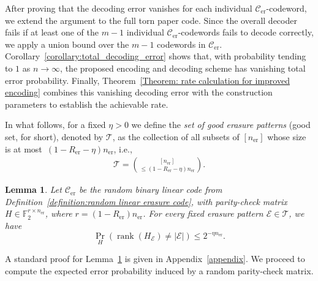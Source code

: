 \documentclass[journal,letterpaper,onecolumn,11pt]{IEEEtran}
\newcommand{\cC}{\mathcal{C}}
\newcommand{\cE}{\mathcal{E}}
\newcommand{\cT}{\mathcal{T}}
\newcommand{\rank}{\operatorname{rank}}
\newtheorem{lemma}{Lemma}
\begin{document}
After proving that the decoding error vanishes for each individual $\cC_{\mathrm{er}}$-codeword, we extend the argument to the full torn paper code. 
Since the overall decoder fails if at least one of the $m-1$ individual $\cC_{\mathrm{er}}$-codewords fails to decode correctly, we apply a union bound over the $m-1$ codewords in $\cC_{\mathrm{er}}$.
Corollary~\ref{corollary:total_decoding_error} shows that, with probability tending to
$1$ as $n \to \infty$, the proposed encoding and decoding scheme has vanishing total error probability. 
Finally,
Theorem~\ref{Theorem: rate calculation for improved encoding} combines this vanishing decoding error with the
construction parameters to establish the achievable rate.

In what follows, for a fixed $\eta>0$ we define the \textit{set of good erasure patterns} (good set, for short), denoted by $\cT$, as the collection of all subsets of $[n_{\mathrm{er}}]$ whose size is at most~$(1-R_{\mathrm{er}}-\eta)n_{\mathrm{er}}$, i.e.,
\begin{align}\label{equation: definition of mathcal T}
     \cT = \binom{[n_\text{er}]}{\le (1-R_{\mathrm{er}}-\eta)n_{\mathrm{er}}}.
\end{align}

\begin{lemma}\label{lemma:random linear code random erasures}
Let $\cC_{\mathrm{er}}$ be the random binary linear code from Definition~\ref{definition:random linear erasure code}, with parity-check matrix $H\in\mathbb{F}_2^{r\times n_{\mathrm{er}}}$, where $r=(1-R_{\mathrm{er}})n_{\mathrm{er}}$.
For every fixed erasure pattern $\cE\in\cT$, we have
$$ \Pr_H(\rank(H_\cE) \ne |\cE|) \le 2^{-\eta n_{\mathrm{er}}}. $$
\end{lemma}

A standard proof for Lemma~\ref{lemma:random linear code random erasures} is given in Appendix~\ref{appendix}.
We proceed to compute the expected error probability induced by a random parity-check matrix.
 
\end{document}
